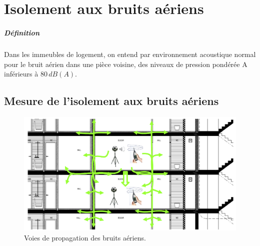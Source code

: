 \documentclass[11pt]{report}
\begin{document}
\chapter{Isolement aux bruits aériens}
\paragraph{Définition} Dans les immeubles de logement, on entend par environnement acoustique normal pour le bruit aérien dans une pièce voisine, des niveaux de pression pondérée A inférieurs à $80\,dB(A)$.


\section{Mesure de l'isolement aux bruits aériens}
\begin{figure}[ht]
\centering
\includegraphics[width=0.8\linewidth]{aer}
\caption{Voies de propagation des bruits aériens.}
\label{aer}
\end{figure}
\end{document}

